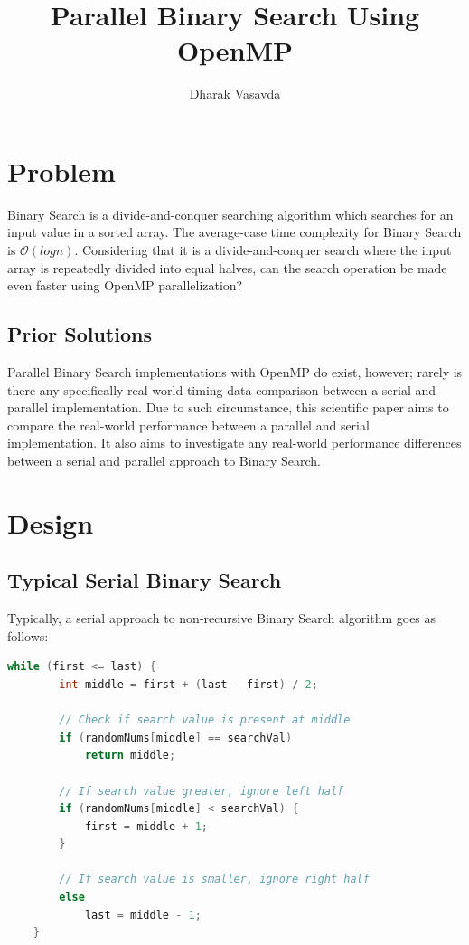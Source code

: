 \documentclass[fleqn,10pt]{wlscirep}
\title{Parallel Binary Search Using OpenMP}
\author{Dharak Vasavda}
\affil{$d\_vasavda@u.pacific.edu$}
\begin{document}
\maketitle
\flushbottom
\pagebreak
\raggedbottom


\section{Problem}
Binary Search is a divide-and-conquer searching algorithm which searches for an input value in a sorted array. The average-case time complexity for Binary Search is $\mathcal{O}(log{}n)$. Considering that it is a divide-and-conquer search where the input array is repeatedly divided into equal halves, can the search operation be made even faster using OpenMP parallelization?

\subsection*{Prior Solutions}
Parallel Binary Search implementations with OpenMP do exist, however; rarely is there any specifically real-world timing data comparison between a serial and parallel implementation. Due to such circumstance, this scientific paper aims to compare the real-world performance between a parallel and serial implementation. It also aims to investigate any real-world performance differences between a serial and parallel approach to Binary Search.

\section{Design}
\subsection*{Typical Serial Binary Search}
Typically, a serial approach to non-recursive Binary Search algorithm goes as follows:

\begin{lstlisting}[language=C, caption=Serial Binary Search]
    while (first <= last) {
        int middle = first + (last - first) / 2;

        // Check if search value is present at middle
        if (randomNums[middle] == searchVal)
            return middle;

        // If search value greater, ignore left half
        if (randomNums[middle] < searchVal) {
            first = middle + 1;
        }

        // If search value is smaller, ignore right half
        else
            last = middle - 1;
    }
\end{lstlisting}
\end{document}
